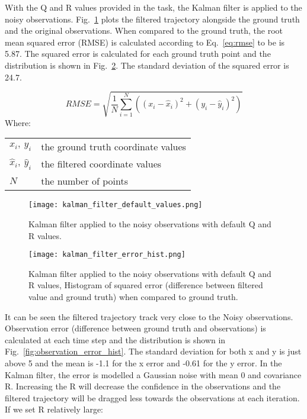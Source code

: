 \documentclass{report}
\makeatletter
\newenvironment{conditions}
  {\par\vspace{\abovedisplayskip}\noindent\begin{tabular}{>{$}l<{$} @{${}={}$} l}}
  {\end{tabular}\par\vspace{\belowdisplayskip}}
\makeatother
\begin{document}
With the Q and R values provided in the task, the Kalman filter is applied to the noisy observations. Fig.~\ref{fig:kalman_filter_default_values} plots the filtered trajectory alongside the ground truth and the original observations. When compared to the ground truth, the root mean squared error (RMSE) is calculated according to Eq.~\ref{eq:rmse} to be is 5.87. The squared error is calculated for each ground truth point and the distribution is shown in Fig.~\ref{fig:kalman_filter_error_hist}. The standard deviation of the squared error is 24.7.

\begin{equation}
    RMSE = \sqrt{\frac{1}{N} \sum_{i=1}^{N} ((x_{i} - \hat{x}_{i})^2 + (y_{i} - \hat{y}_{i})^2)}
    \label{eq:rmse}
\end{equation}
Where:
\begin{conditions}
 x_{i},\ y_{i}             & the ground truth coordinate values \\
 \hat{x}_{i},\ \hat{y}_{i} & the filtered coordinate values \\
 N                         & the number of points
\end{conditions}

\begin{figure}[ht]
    \centering
    \texttt{[image: kalman\_filter\_default\_values.png]}
    \caption{Kalman filter applied to the noisy observations with default Q and R values.}
    \label{fig:kalman_filter_default_values}
\end{figure}

\begin{figure}[ht]
    \centering
    \texttt{[image: kalman\_filter\_error\_hist.png]}
    \caption{Kalman filter applied to the noisy observations with default Q and R values, Histogram of squared error (difference between filtered value and ground truth) when compared to ground truth.}
    \label{fig:kalman_filter_error_hist}
\end{figure}


It can be seen the filtered trajectory track very close to the Noisy observations. 
Observation error (difference between ground truth and observations) is calculated at each time step and the distribution is shown in Fig.~\ref{fig:observation_error_hist}. The standard deviation for both x and y is just above 5 and the mean is -1.1 for the x error and -0.61 for the y error. In the Kalman filter, the error is modelled a Gaussian noise with mean 0 and covariance R. Increasing the R will decrease the confidence in the observations and the filtered trajectory will be dragged less towards the observations at each iteration. If we set R relatively large:
\end{document}
